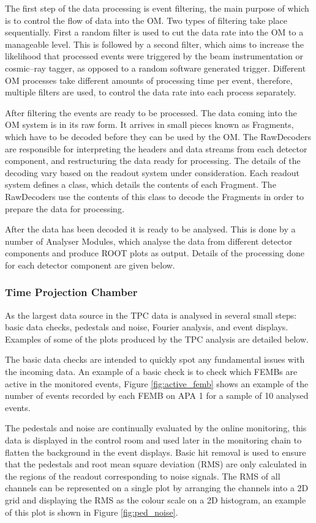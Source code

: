 The first step of the data processing is event filtering, the main purpose of
which is to control the flow of data into the OM. Two types of filtering
take place sequentially. First a random filter is used to cut the data rate 
into the OM to a manageable level. This is followed by a second filter, which 
aims to increase the likelihood that processed events were triggered by the 
beam instrumentation or cosmic--ray tagger, as opposed to a random software 
generated trigger. Different OM processes take different amounts of processing 
time per event, therefore, multiple filters are used, to control the data rate 
into each process separately.

After filtering the events are ready to be processed. The data coming into the
OM system is in its raw form. It arrives in small pieces known as Fragments,
which have to be decoded before they can be used by the OM. The RawDecoders 
are responsible for interpreting the headers and data streams from each 
detector component, and restructuring the data ready for processing. The 
details of the decoding vary based on the readout system under consideration. 
Each readout system defines a class, which details the contents of each
Fragment. The RawDecoders use the contents of this class to decode the
Fragments in order to prepare the data for processing.

After the data has been decoded it is ready to be analysed. This is done by a
number of Analyser Modules, which analyse the data from different detector
components and produce ROOT\cite{ANTCHEVA20092499} plots as output. Details 
of the processing done for each detector component are given below.

\subsubsection*{Time Projection Chamber}
As the largest data source in \protodune{} the TPC data is analysed in several
small steps: basic data checks, pedestals and noise, Fourier analysis, and event
displays. Examples of some of the plots produced by the TPC analysis are
detailed below.

The basic data checks are intended to quickly spot any fundamental issues with
the incoming data. An example of a basic check is to check which FEMBs are
active in the monitored events, Figure \ref{fig:active_femb} shows an example of
the number of events recorded by each FEMB on APA 1 for a sample of 10 analysed
events.

The pedestals and noise are continually evaluated by the online monitoring, this
data is displayed in the control room and used later in the monitoring chain to
flatten the background in the event displays. Basic hit removal is used to 
ensure that the pedestals and root mean square deviation (RMS) are only 
calculated in the regions of the readout corresponding to noise signals. The 
RMS of all channels can be represented on a single plot by arranging the 
channels into a 2D grid and displaying the RMS as the colour scale on a 2D 
histogram, an example of this plot is shown in Figure \ref{fig:ped_noise}.


